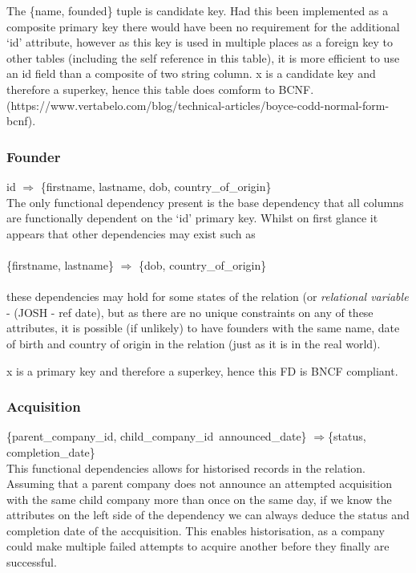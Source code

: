 \documentclass[12pt]{article}
\begin{document}
The \{{name, founded\}} tuple is candidate key. Had this been implemented as a composite primary key there would have been no requirement for the additional `id' attribute, however as this key is used in multiple places as a foreign key to other tables (including the self reference in this table), it is more efficient to use an id field than a composite of two string column. x is a candidate key and therefore a superkey, hence this table does comform to BCNF. (https://www.vertabelo.com/blog/technical-articles/boyce-codd-normal-form-bcnf).

\subsubsection{Founder}
id $\Rightarrow$ \{{firstname, lastname, dob, country\_of\_origin\}}\\

The only functional dependency present is the base dependency that all columns are functionally dependent on the `id' primary key. Whilst on first glance it appears that other dependencies may exist such as \\\\
\{{firstname, lastname\}} $\Rightarrow$ \{{dob, country\_of\_origin\}}\\\\
these dependencies may hold for some states of the relation (or \emph{relational variable} - (JOSH - ref date), but as there are no unique constraints on any of these attributes, it is possible (if unlikely) to have founders with the same name, date of birth and country of origin in the relation (just as it is in the real world).

x is a primary key and therefore a superkey, hence this FD is BNCF compliant.

\subsubsection{Acquisition}
\{{parent\_company\_id, child\_company\_id\, announced\_date}\} $\Rightarrow${\{status, completion\_date}\} \\

This functional dependencies allows for historised records in the relation. Assuming that a parent company does not announce an attempted acquisition with the same child company more than once on the same day, if we know the attributes on the left side of the dependency we can always deduce the status and completion date of the accquisition. This enables historisation, as a company could make multiple failed attempts to acquire another before they finally are successful.
\end{document}
